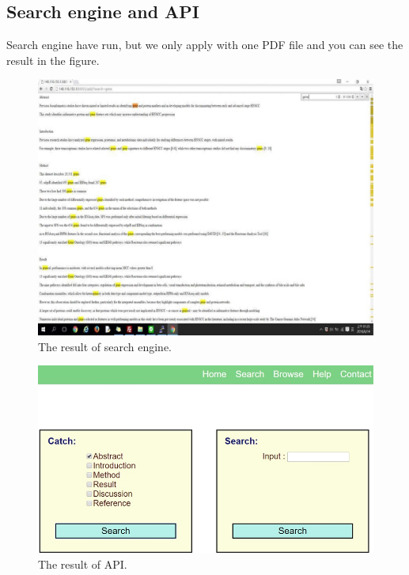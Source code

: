 	\subsection*{Search engine and API}
	Search engine have run, but we only apply with one PDF file and you can see the result in the figure. 

	\begin{figure}[tbh]
		\begin{center}
			\includegraphics[width=\columnwidth]{Union_Result_Chart_Search engine}
		\end{center}
		\caption{The result of search engine.}
	\end{figure}

	\begin{figure}[tbh]
		\begin{center}
			\includegraphics[width=\columnwidth]{Union_Result_Chart_API}
		\end{center}
		\caption{The result of API.}
	\end{figure}

